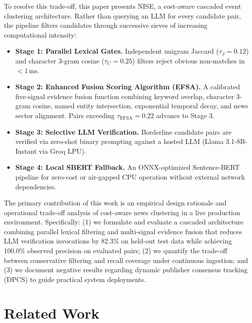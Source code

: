 \documentclass[conference]{IEEEtran}
\begin{document}
To resolve this trade-off, this paper presents NISE, a cost-aware cascaded event clustering architecture.
Rather than querying an LLM for every candidate pair, the pipeline filters candidates through successive sieves of increasing computational intensity:
\begin{itemize}
    \item \textbf{Stage 1: Parallel Lexical Gates.} Independent unigram Jaccard ($\tau_J = 0.12$) and character 3-gram cosine ($\tau_C = 0.25$) filters reject obvious non-matches in $<1$\,ms.
    \item \textbf{Stage 2: Enhanced Fusion Scoring Algorithm (EFSA).} A calibrated five-signal evidence fusion function combining keyword overlap, character 3-gram cosine, named entity intersection, exponential temporal decay, and news sector alignment. Pairs exceeding $\tau_{\text{EFSA}} = 0.22$ advance to Stage 3.
    \item \textbf{Stage 3: Selective LLM Verification.} Borderline candidate pairs are verified via zero-shot binary prompting against a hosted LLM (Llama 3.1-8B-Instant via Groq LPU).
    \item \textbf{Stage 4: Local SBERT Fallback.} An ONNX-optimized Sentence-BERT pipeline for zero-cost or air-gapped CPU operation without external network dependencies.
\end{itemize}

The primary contribution of this work is an empirical design rationale and operational trade-off analysis of cost-aware news clustering in a live production environment.
Specifically: (1) we formulate and evaluate a cascaded architecture combining parallel lexical filtering and multi-signal evidence fusion that reduces LLM verification invocations by 82.3\% on held-out test data while achieving 100.0\% observed precision on evaluated pairs; (2) we quantify the trade-off between conservative filtering and recall coverage under continuous ingestion; and (3) we document negative results regarding dynamic publisher consensus tracking (DPCS) to guide practical system deployments.

\section{Related Work}
\end{document}
